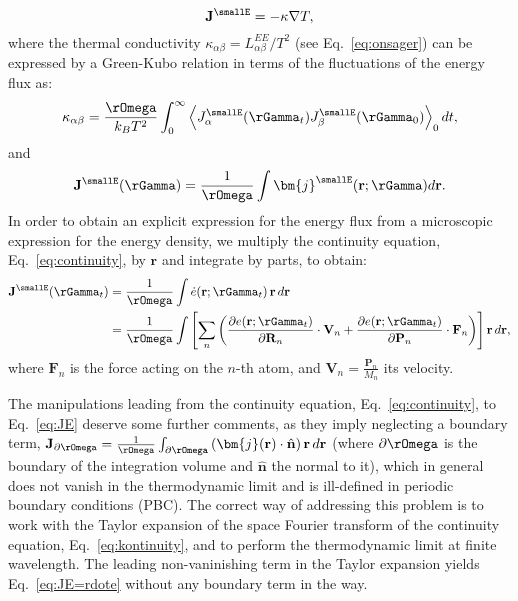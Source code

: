 \begin{equation}
  \mathbf{J}^\smallE = - \kappa \nabla T, \label{eq:thermal-constitutive}
\end{equation}
where the thermal conductivity $\kappa_{\alpha\beta}= L^{\scriptscriptstyle EE}_{\alpha \beta} / T^2$ (see Eq.~\eqref{eq:onsager}) can be expressed by a Green-Kubo relation in terms of the fluctuations of the energy flux as:
\begin{equation}
  \kappa_{\alpha\beta} =\frac{\rOmega}{k_B T^2} \int_0^\infty \left \langle J^\smallE_\alpha(\rGamma_t) J^\smallE_\beta(\rGamma_0) \right \rangle_0 dt, \label{eq:GK-complete}
\end{equation}
and
\begin{equation}
  \mathbf{J}^\smallE(\rGamma)  = \frac{1}{\rOmega} \int \bm{j}^\smallE(\mathbf{r};\rGamma) d\mathbf{r}. \label{eq:avg-current-density}
\end{equation}
In order to obtain an explicit expression for the energy flux from a microscopic expression for the energy density, we multiply the continuity equation, Eq.~\eqref{eq:continuity}, by $\mathbf{r}$ and integrate by parts, to obtain:
\begin{align}
  \mathbf{J}^\smallE(\rGamma_t) &= \frac{1}{\rOmega} \int  \dot e(\mathbf{r};\rGamma_t) \,\mathbf{r}\, d\mathbf{r} \label{eq:JE=rdote} \\
  & = \frac{1}{\rOmega} \int
  \left[ \sum_n \left(
    \frac{\partial e(\mathbf{r};\rGamma_t)}{\partial \mathbf{R}_n} \cdot \mathbf{V}_n +
    \frac{\partial e(\mathbf{r};\rGamma_t)}{\partial \mathbf{P}_n} \cdot \mathbf{F}_n
  \right)  \right] \mathbf{r}\, d\mathbf{r}, \label{eq:JE}
\end{align}
where $ \mathbf{F}_n $ is the force acting on the $n$-th atom, and $\mathbf{V}_n=\frac{\mathbf{P}_n}{M_n}$ its velocity.

The manipulations leading from the continuity equation, Eq.~\eqref{eq:continuity}, to Eq.~\eqref{eq:JE} deserve some further comments, as they imply neglecting a boundary term, $\mathbf{J}_{\partial \rOmega} =
\frac{1}{\rOmega} \int_{\partial\rOmega}
 \left( \bm{j}(\mathbf{r}) \cdot \hat{\mathbf{n}} \right)
\mathbf{r} \,d\mathbf{r} $  (where $ \partial\rOmega $ is the boundary of the integration volume and $\hat{\mathbf{n}}$ the normal to it), which in general does not vanish in the thermodynamic limit and is ill-defined in periodic boundary conditions (PBC). The correct way of addressing this problem is to work with the Taylor expansion of the space Fourier transform of the continuity equation, Eq.~\eqref{eq:kontinuity}, and to perform the thermodynamic limit at finite wavelength. The leading non-vaninishing term in the Taylor expansion yields Eq.~\eqref{eq:JE=rdote} without any boundary term in the way.


